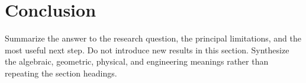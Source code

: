 \section{Conclusion}
\label{sec:conclusion}

Summarize the answer to the research question, the principal limitations, and
the most useful next step. Do not introduce new results in this section.
Synthesize the algebraic, geometric, physical, and engineering meanings rather
than repeating the section headings.
